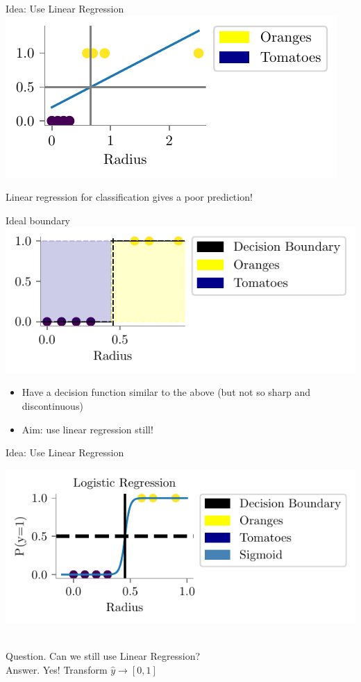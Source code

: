 \documentclass{beamer}
\begin{document}
\begin{frame}{Idea: Use Linear Regression}
\includegraphics{../figures/logistic-regression/linear-orange-tomatoes-decision-modified.pdf}


Linear regression for classification gives a poor prediction!
\end{frame}

\begin{frame}{Ideal boundary}
\includegraphics{../figures/logistic-regression/linear-orange-tomatoes-decision-ideal.pdf}

\begin{itemize}[<+->]
	\item Have a decision function similar to the above (but not so sharp and discontinuous)
	\item Aim: use linear regression still!
\end{itemize}
\end{frame}

\begin{frame}{Idea: Use Linear Regression}
\hspace{1cm}
\begin{minipage}{0.3\textwidth}
\includegraphics{../figures/logistic-regression/logistic.pdf}
\end{minipage} \\
Question. Can we still use Linear Regression? \\
Answer. Yes! Transform $\hat{y} \rightarrow [0, 1]$
\end{frame}
\end{document}
